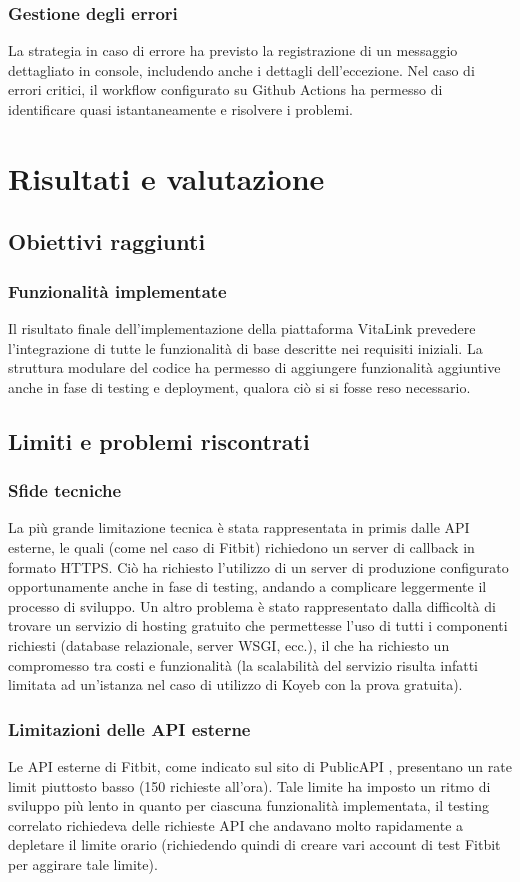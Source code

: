 \documentclass[12pt,a4paper,oneside]{report}
\begin{document}
\subsection{Gestione degli errori}
La strategia in caso di errore ha previsto la registrazione di un messaggio dettagliato in console, includendo anche i dettagli dell'eccezione.
Nel caso di errori critici, il workflow configurato su Github Actions ha permesso di identificare quasi istantaneamente e risolvere i problemi.

\chapter{Risultati e valutazione}
\section{Obiettivi raggiunti}
\subsection{Funzionalità implementate}
Il risultato finale dell'implementazione della piattaforma VitaLink prevedere l'integrazione di tutte le funzionalità di base descritte nei requisiti iniziali.
La struttura modulare del codice ha permesso di aggiungere funzionalità aggiuntive anche in fase di testing e deployment, qualora ciò si si fosse reso necessario.

\section{Limiti e problemi riscontrati}
\subsection{Sfide tecniche}
La più grande limitazione tecnica è stata rappresentata in primis dalle API esterne, le quali (come nel caso di Fitbit) richiedono un server di callback in formato HTTPS.
Ciò ha richiesto l'utilizzo di un server di produzione configurato opportunamente anche in fase di testing, andando a complicare leggermente il processo di sviluppo.
Un altro problema è stato rappresentato dalla difficoltà di trovare un servizio di hosting gratuito che permettesse l'uso di tutti i componenti richiesti (database relazionale, server WSGI, ecc.), il che ha richiesto un compromesso tra costi e funzionalità (la scalabilità del servizio risulta infatti limitata ad un'istanza nel caso di utilizzo di Koyeb con la prova gratuita).
\subsection{Limitazioni delle API esterne}
Le API esterne di Fitbit, come indicato sul sito di PublicAPI \cite{fitbit_API_rate}, presentano un rate limit piuttosto basso (150 richieste all'ora). Tale limite ha imposto un ritmo di sviluppo più lento in quanto per ciascuna funzionalità implementata, il testing correlato richiedeva delle richieste API che andavano molto rapidamente a depletare il limite orario (richiedendo quindi di creare vari account di test Fitbit per aggirare tale limite).
\end{document}
